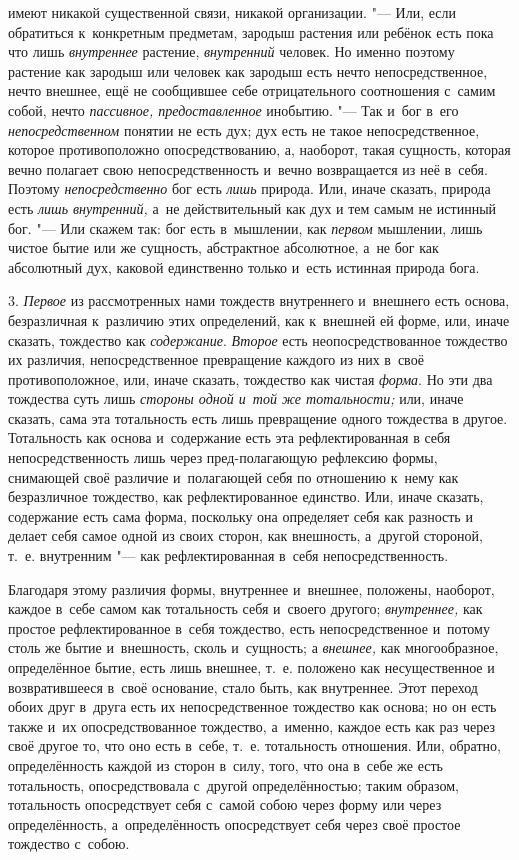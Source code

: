 имеют никакой существенной связи, никакой организации. "--- Или, если
обратиться к~конкретным предметам, зародыш растения или ребёнок есть пока
что лишь {\em внутреннее} растение,
{\em внутренний} человек. Но именно поэтому растение
как зародыш или человек как зародыш есть нечто непосредственное, нечто
внешнее, ещё не сообщившее себе отрицательного соотношения с~самим собой,
нечто {\em пассивное, предоставленное} инобытию. "--- Так
и~бог в~его {\em непосредственном} понятии не есть дух;
дух есть не такое непосредственное, которое противоположно
опосредствованию, а, наоборот, такая сущность, которая вечно полагает свою
непосредственность и~вечно возвращается из неё в~себя. Поэтому
{\em непосредственно} бог есть
{\em лишь} природа. Или, иначе сказать, природа есть
{\em лишь внутренний,} а~не действительный как дух и
тем самым не истинный бог. "--- Или скажем так: бог есть в~мышлении, как
{\em первом} мышлении, лишь чистое бытие или же
сущность, абстрактное абсолютное, а~не бог как абсолютный дух, каковой
единственно только и~есть истинная природа бога.

3. {\em Первое} из рассмотренных нами тождеств
внутреннего и~внешнего есть основа, безразличная к~различию этих
определений, как к~внешней ей форме, или, иначе сказать, тождество как
{\em содержание}. {\em Второе} есть
неопосредствованное тождество их различия, непосредственное превращение
каждого из них в~своё противоположное, или, иначе сказать, тождество как
чистая {\em форма}. Но эти два тождества суть лишь
{\em стороны одной и~той же тотальности;} или, иначе
сказать, сама эта тотальность есть лишь превращение одного тождества в
другое. Тотальность как основа и~содержание есть эта рефлектированная в
себя непосредственность лишь через пред-полагающую рефлексию формы,
снимающей своё различие и~полагающей себя по отношению к~нему как
безразличное тождество, как рефлектированное единство. Или, иначе сказать,
содержание есть сама форма, поскольку она определяет себя как разность и
делает себя самое одной из своих сторон, как внешность, а~другой стороной,
т.~е. внутренним "--- как рефлектированная в~себя непосредственность.

Благодаря этому различия формы, внутреннее и~внешнее, положены, наоборот,
каждое в~себе самом как тотальность себя и~своего другого;
{\em внутреннее,} как простое рефлектированное в~себя
тождество, есть непосредственное и~потому столь же бытие и~внешность, сколь
и~сущность; а {\em внешнее,} как многообразное,
определённое бытие, есть лишь внешнее, т.~е. положено как несущественное и
возвратившееся в~своё основание, стало быть, как внутреннее. Этот переход
обоих друг в~друга есть их непосредственное тождество как основа; но он
есть также и~их опосредствованное тождество, а~именно, каждое есть как раз
через своё другое то, что оно есть в~себе, т.~е. тотальность отношения.
Или, обратно, определённость каждой из сторон в~силу, того, что она в~себе
же есть тотальность, опосредствовала с~другой определённостью; таким
образом, тотальность опосредствует себя с~самой собою через форму или через
определённость, а~определённость опосредствует себя через своё простое
тождество с~собою.

